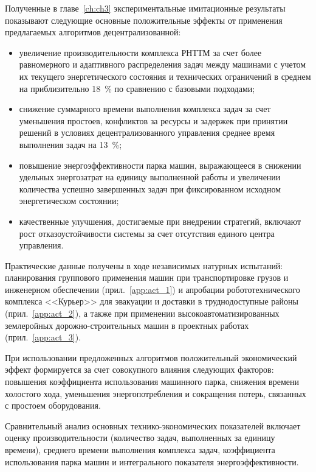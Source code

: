 Полученные в главе~\ref{ch:ch3} экспериментальные имитационные результаты показывают следующие основные положительные эффекты от применения предлагаемых алгоритмов децентрализованной:

\begin{itemize}[beginpenalty=10000, midpenalty=10000, wide=\parindent, leftmargin=0pt]
	\item увеличение производительности комплекса РНТТМ за счет более равномерного и адаптивного распределения задач между машинами с учетом их текущего энергетического состояния и технических ограничений в среднем на приблизительно 18~\% по сравнению с базовыми подходами;

	\item снижение суммарного времени выполнения комплекса задач за счет уменьшения простоев, конфликтов за ресурсы и задержек при принятии решений в условиях децентрализованного управления среднее время выполнения задач на 13~\%;

	\item повышение энергоэффективности парка машин, выражающееся в снижении удельных энергозатрат на единицу выполненной работы и увеличении количества успешно завершенных задач при фиксированном исходном энергетическом состоянии;

	\item качественные улучшения, достигаемые при внедрении стратегий, включают рост отказоустойчивости системы за счет отсутствия единого центра управления.
\end{itemize}

Практические данные получены в ходе независимых натурных испытаний: планирования группового применения машин при транспортировке грузов и инженерном обеспечении (прил.~\ref{app:act_1}) и апробации робототехнического комплекса <<Курьер>> для эвакуации и доставки в труднодоступные районы (прил.~\ref{app:act_2}), а также при применении высокоавтоматизированных землеройных дорожно-строительных машин в проектных работах (прил.~\ref{app:act_3}).

При использовании предложенных алгоритмов положительный экономический эффект формируется за счет совокупного влияния следующих факторов: повышения коэффициента использования машинного парка, снижения времени холостого хода, уменьшения энергопотребления и сокращения потерь, связанных с простоем оборудования.

Сравнительный анализ основных технико-экономических показателей включает оценку производительности (количество задач, выполненных за единицу времени), среднего времени выполнения комплекса задач, коэффициента использования парка машин и интегрального показателя энергоэффективности.

